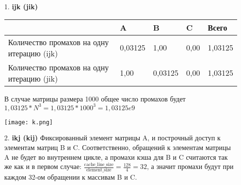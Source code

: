 \documentclass[12pt,a4paper,oneside,final]{article}
\begin{document}
\begin{enumerate}

\item[1.] \textbf{ijk (jik)}


\begin{table}[h]
\begin{center}
\begin{tabular}{|l|l|l|l|l|}
\hline
                                           & A       & B       & C    & Всего   \\ \hline
Количество промахов на одну итерацию (ijk) & 0,03125 & 1,00    & 0,00 & 1,03125 \\ \hline
Количество промахов на одну итерацию (jik) & 1,00    & 0,03125 & 0,00 & 1,03125 \\ \hline
\end{tabular}
\end{center}
\end{table}

В случае матрицы размера 1000 общее число промахов будет $1,03125  * N^3 = 1,03125 * 1000^3 = 1,03125e9$

\begin{center}
\texttt{[image: k.png]}
\label{fig:mpr}
\end{center}

\newpage
\item[2.]  \textbf{ikj (kij)}
Фиксированный элемент матрицы A, и построчный доступ к элементам матриц B и C. Соответственно, обращений к элементам матрицы A не будет во внутреннем цикле, а промахи кэша для B и C считаются так же как и в первом случае:  ${\displaystyle\frac{\mbox{cache\_line\_size}}{\mbox{element\_size}}} = \frac{128}{4} = 32$, а значит промахи будут при каждом 32-ом обращении к массивам B и C.


\end{enumerate}
\end{document}

